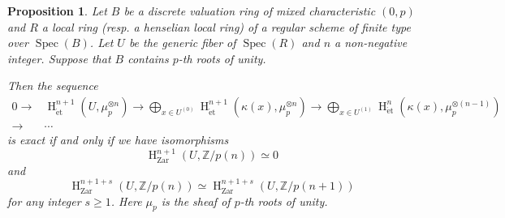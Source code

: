 \documentclass{article}
\newtheorem{prop}[thm]{\indent \sc Proposition}
\newcommand{\spec}{\operatorname{Spec}}
\newcommand{\et}{\mathrm{\acute{e}t}}
\newcommand{\Zar}{\mathrm{Zar}}
\newcommand{\HO}{\operatorname{H}}
\begin{document}
%
\begin{prop}\upshape\label{RGCM}
Let $B$ be a discrete valuation ring 
of mixed characteristic $(0, p)$
and $R$ a local ring 
(resp. a henselian local ring)
of a regular scheme of finite type over $\spec(B)$.
Let $U$ be the generic fiber of $\spec(R)$ and $n$ a non-negative integer.
Suppose that $B$ contains $p$-th roots of unity. 

Then the sequence
%
\begin{align}\label{Uex}
0\to& 
\HO^{n+1}_{\et}(U, \mu_{p}^{\otimes n})
\to
\displaystyle\bigoplus_{x\in U^{(0)}}
\HO^{n+1}_{\et}(
\kappa(x),
\mu_{p}^{\otimes n}
)
\to
\displaystyle\bigoplus_{x\in U^{(1)}}
\HO^{n}_{\et}(
\kappa(x),
\mu_{p}^{\otimes (n-1)}
) \nonumber
\\
\to&\cdots
\end{align}
%
is exact 
if and only if
we have isomorphisms
%
\begin{equation*}%
\HO^{n+1}_{\Zar}(U, \mathbb{Z}/p(n))
\simeq 
0
\end{equation*}
%
and
%
\begin{equation*}
\HO^{n+1+s}_{\Zar}(
U,
\mathbb{Z}/p(n)
)    
\simeq
\HO^{n+1+s}_{\Zar}(
U,
\mathbb{Z}/p(n+1)
)
\end{equation*}
%
for any integer $s\geq 1$. Here $\mu_{p}$ is the sheaf of $p$-th roots of unity.
\end{prop}
%
\end{document}
